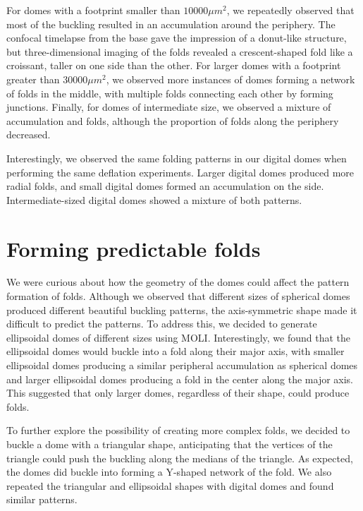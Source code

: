 For domes with a footprint smaller than \(10000 \mu m^2\), we repeatedly
observed that most of the buckling resulted in an accumulation around
the periphery. The confocal timelapse from the base gave the impression
of a donut-like structure, but three-dimensional imaging of the folds
revealed a crescent-shaped fold like a croissant, taller on one side
than the other. For larger domes with a footprint greater than
\(30000\mu m^2\), we observed more instances of domes forming a network
of folds in the middle, with multiple folds connecting each other by
forming junctions. Finally, for domes of intermediate size, we observed
a mixture of accumulation and folds, although the proportion of folds
along the periphery decreased.

Interestingly, we observed the same folding patterns in our digital
domes when performing the same deflation experiments. Larger digital
domes produced more radial folds, and small digital domes formed an
accumulation on the side. Intermediate-sized digital domes showed a
mixture of both patterns.

\hypertarget{forming-predictable-folds}{%
	\section{Forming predictable folds}\label{forming-predictable-folds}}

We were curious about how the geometry of the domes could affect the
pattern formation of folds. Although we observed that different sizes of
spherical domes produced different beautiful buckling patterns, the
axis-symmetric shape made it difficult to predict the patterns. To
address this, we decided to generate ellipsoidal domes of different
sizes using MOLI. Interestingly, we found that the ellipsoidal domes
would buckle into a fold along their major axis, with smaller
ellipsoidal domes producing a similar peripheral accumulation as
spherical domes and larger ellipsoidal domes producing a fold in the
center along the major axis. This suggested that only larger domes,
regardless of their shape, could produce folds.

To further explore the possibility of creating more complex folds, we
decided to buckle a dome with a triangular shape, anticipating that the
vertices of the triangle could push the buckling along the medians of
the triangle. As expected, the domes did buckle into forming a Y-shaped
network of the fold. We also repeated the triangular and ellipsoidal
shapes with digital domes and found similar patterns.

